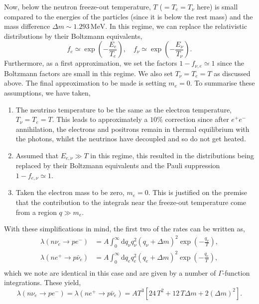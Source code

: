 \documentclass[11pt]{article}
\numberwithin{equation}{section}
\numberwithin{figure}{section}
\numberwithin{table}{section}
\begin{document}
Now, below the neutron freeze-out temperature, $T$ ($= T_e = T_\nu$ here) is small compared to the energies of the particles (since it is below the rest mass) and the mass difference $\Delta m \sim 1.293 \, \mathrm{MeV}$. In this regime, we can replace the relativistic distributions by their Boltzmann equivalents,
\begin{equation}
f_e \simeq \exp\left(-\frac{E_e}{T_e}\right), \quad f_\nu \simeq \exp\left(-\frac{E_\nu}{T_\nu}\right).
\end{equation}
Furthermore, as a first approximation, we set the factors $1 - f_{\nu, e} \simeq 1$ since the Boltzmann factors are small in this regime. We also set $T_\nu = T_e = T$ as discussed above. The final approximation to be made is setting $m_e = 0$. To summarise these assumptions, we have taken,
\begin{enumerate}
\item The neutrino temperature to be the same as the electron temperature, $T_\nu = T_e = T$. This leads to approximately a $10 \%$ correction since after $e^{+} e^{-}$ annihilation, the electrons and positrons remain in thermal equilibrium with the photons, whilst the neutrinos have decoupled and so do not get heated.
\item Assumed that $E_{e, \nu} \gg T$ in this regime, this resulted in the distributions being replaced by their Boltzmann equivalents and the Pauli suppression $1 - f_{e, \nu} \simeq 1$.
\item Taken the electron mass to be zero, $m_e = 0$. This is justified on the premise that the contribution to the integrals near the freeze-out temperature come from a region $q \gg m_e$.
\end{enumerate}
With these simplifications in mind, the first two of the rates can be written as,
\begin{align}
\lambda(n \nu_e \rightarrow p e^{-}) &= A \int_0^{\infty}{\mathrm{d}q_\nu q_\nu^2 \left(q_\nu + \Delta m\right)^2 \exp \left(-\frac{q_\nu}{T}\right)}, \\
\lambda(n e^+ \rightarrow p \bar{\nu}_e) &= A \int_0^{\infty}{\mathrm{d}q_e q_e^2 \left(q_e + \Delta m\right)^2 \exp \left(-\frac{q_e}{T}\right)}, \\
\end{align}
which we note are identical in this case and are given by a number of $\Gamma$-function integrations. These yield,
\begin{equation}
\lambda(n \nu_e \rightarrow p e^-) = \lambda(n e^+ \rightarrow p \bar{\nu}_e) = A T^3 \left[24 \, T^2 + 12 \, T \Delta m + 2 (\Delta m)^2\right].
\end{equation}
\end{document}
